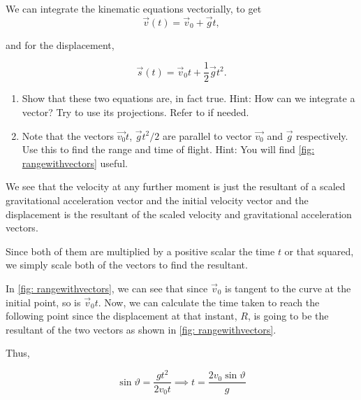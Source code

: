 \begin{exc}
    \begin{exercise}[points = 3]
        We can integrate the kinematic equations 
        vectorially, to get 
        \begin{equation*}
            \vec{v}(t) = \vec{v}_0 + \vec{g}t,
        \end{equation*}
        
        and for the displacement,
        
        \begin{equation*}
            \vec{s}(t) = \vec{v}_0t + \frac{1}{2}\vec{g}t^2.
        \end{equation*}

        \begin{enumerate}[label=(\alph*)]
            \item Show that these two equations are, in fact true. Hint: How can we integrate a vector? Try to use its projections. Refer to   if needed.
            \item Note that the vectors \(\vec{v_0}t\), \(\vec{g}t^2/2\) are parallel to vector \(\vec{v_0}\) and \(\vec{g}\) respectively. Use this to find the range and time of flight. Hint: You will find \cref{fig: rangewithvectors} useful. 
        \end{enumerate}
    \end{exercise}

    \begin{solution}
        We see that the velocity at any further moment is just the resultant of a scaled 
        gravitational acceleration vector and the initial velocity vector and the displacement is the resultant of 
        the scaled velocity and gravitational acceleration vectors. 
        
        Since both of them are multiplied by a positive scalar the time \(t\) or that squared, we simply
        scale both of the vectors to find the resultant.
        
        In \cref{fig: rangewithvectors}, we can see that since \(\vec{v}_0\) is tangent 
        to the curve at the initial point, so is \(\vec{v}_0t\). Now, we can calculate 
        the time taken to reach the following point since the displacement at that instant, 
        \(R\), is going to be the resultant of the two vectors as shown in \cref{fig: rangewithvectors}.
        
        Thus,

        \begin{equation*}
            \sin\vartheta = \frac{gt^2}{2v_0t} \implies t = \frac{2v_0\sin\vartheta}{g}
        \end{equation*}


\end{solution}
\end{exc}
